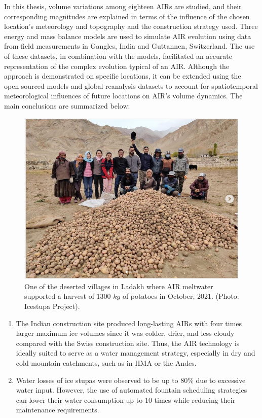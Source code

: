 In this thesis, volume variations among eighteen \ac{AIRs} are studied, and their corresponding magnitudes
are explained in terms of the influence of the chosen location's meteorology and topography and the construction
strategy used. Three energy and mass balance models are used to simulate \ac{AIR} evolution using data from field
measurements in Gangles, India and Guttannen, Switzerland. The use of these datasets, in combination with the
models, facilitated an accurate representation of the complex evolution typical of an \ac{AIR}. Although the
approach is demonstrated on specific locations, it can be extended using the open-sourced models and global
reanalysis datasets to account for spatiotemporal meteorological influences of future locations on \ac{AIR}'s
volume dynamics. The main conclusions are summarized below:

\begin{figure}[htb]
  \centering
	\includegraphics[width=8 cm]{figs/Kullum_potatoes}
	\caption{One of the deserted villages in Ladakh where \ac{AIR} meltwater supported a harvest of 1300 $kg$ of
		potatoes in October, 2021. (Photo: Icestupa Project).}
	\label{fig:kullum_potatoes}
\end{figure}

\begin{enumerate}

  \item The Indian construction site produced long-lasting \ac{AIRs} with four times larger maximum ice volumes
    since it was colder, drier, and less cloudy compared with the Swiss construction site. Thus, the \ac{AIR}
    technology is ideally suited to serve as a water management strategy, especially in dry and cold mountain
    catchments, such as in \ac{HMA} or the Andes.

  \item Water losses of ice stupas were observed to be up to 80\% due to excessive water input. However, the use
    of automated fountain scheduling strategies can lower their water consumption up to 10 times while reducing
    their maintenance requirements.

\end{enumerate}

